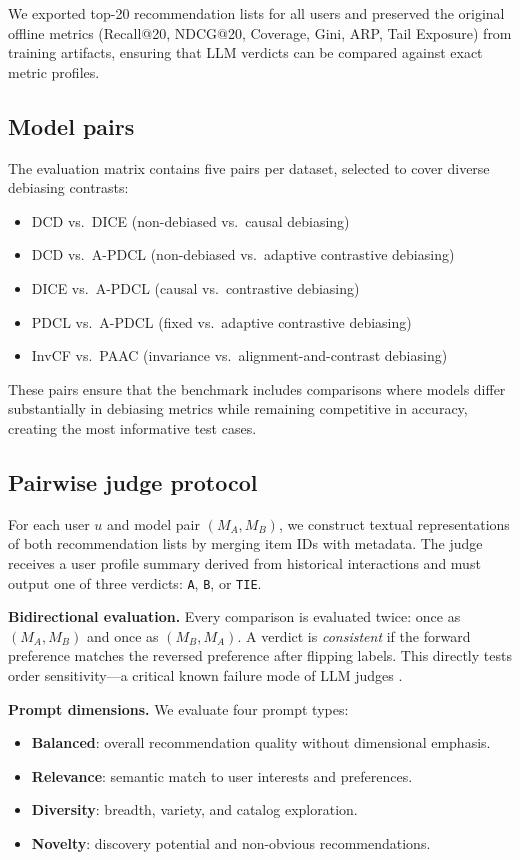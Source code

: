 \documentclass[pdflatex,sn-basic,referee,lineno]{sn-jnl}
\begin{document}
We exported top-20 recommendation lists for all users and preserved the original offline metrics (Recall@20, NDCG@20, Coverage, Gini, ARP, Tail Exposure) from training artifacts, ensuring that LLM verdicts can be compared against exact metric profiles.

\subsection{Model pairs}

The evaluation matrix contains five pairs per dataset, selected to cover diverse debiasing contrasts:
\begin{itemize}
\item DCD vs.\ DICE (non-debiased vs.\ causal debiasing)
\item DCD vs.\ A-PDCL (non-debiased vs.\ adaptive contrastive debiasing)
\item DICE vs.\ A-PDCL (causal vs.\ contrastive debiasing)
\item PDCL vs.\ A-PDCL (fixed vs.\ adaptive contrastive debiasing)
\item InvCF vs.\ PAAC (invariance vs.\ alignment-and-contrast debiasing)
\end{itemize}

These pairs ensure that the benchmark includes comparisons where models differ substantially in debiasing metrics while remaining competitive in accuracy, creating the most informative test cases.

\subsection{Pairwise judge protocol}

For each user $u$ and model pair $(M_A, M_B)$, we construct textual representations of both recommendation lists by merging item IDs with metadata. The judge receives a user profile summary derived from historical interactions and must output one of three verdicts: \texttt{A}, \texttt{B}, or \texttt{TIE}.

\noindent\textbf{Bidirectional evaluation.}  Every comparison is evaluated twice: once as $(M_A, M_B)$ and once as $(M_B, M_A)$. A verdict is \emph{consistent} if the forward preference matches the reversed preference after flipping labels. This directly tests order sensitivity---a critical known failure mode of LLM judges \citep{zheng2023judging,raina2025judging}.

\noindent\textbf{Prompt dimensions.}  We evaluate four prompt types:
\begin{itemize}
\item \textbf{Balanced}: overall recommendation quality without dimensional emphasis.
\item \textbf{Relevance}: semantic match to user interests and preferences.
\item \textbf{Diversity}: breadth, variety, and catalog exploration.
\item \textbf{Novelty}: discovery potential and non-obvious recommendations.
\end{itemize}
\end{document}
